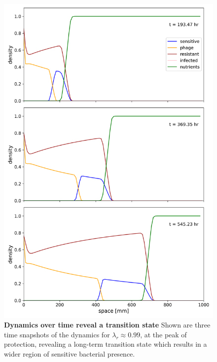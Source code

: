 \begin{figure}
\centering
\includegraphics[width=\linewidth]{graphics/2025_09_30_phages_fig6.png}
\caption{\textbf{Dynamics over time reveal a transition state} Shown are three time snapshots of the dynamics for $\lambda_r \approx 0.99$, at the peak of protection, revealing a long-term transition state which results in a wider region of sensitive bacterial presence.}
\label{fig:dynamics_peak}
\end{figure}

